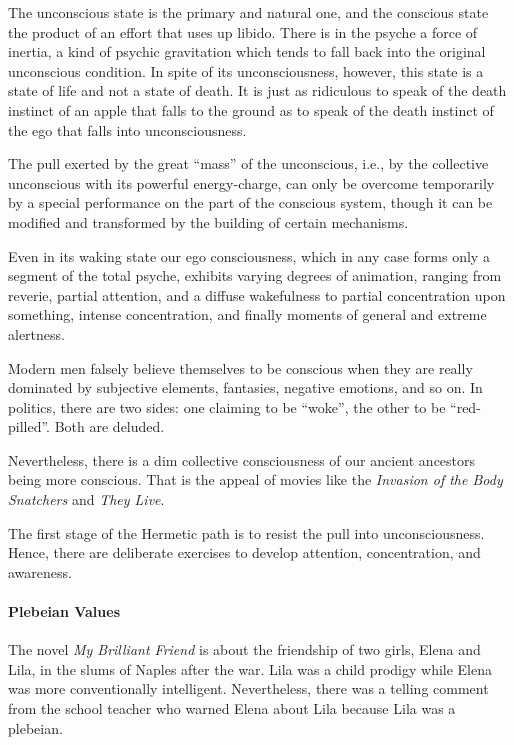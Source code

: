\begin{quotationx}
The unconscious state is the primary and natural one, and the conscious state the product of an effort that uses up libido. There is in the psyche a force of inertia, a kind of psychic gravitation which tends to fall back into the original unconscious condition. In spite of its unconsciousness, however, this state is a state of life and not a state of death. It is just as ridiculous to speak of the death instinct of an apple that falls to the ground as to speak of the death instinct of the ego that falls into unconsciousness.

The pull exerted by the great ``mass'' of the unconscious, i.e., by the collective unconscious with its powerful energy-charge, can only be overcome temporarily by a special performance on the part of the conscious system, though it can be modified and transformed by the building of certain mechanisms.

Even in its waking state our ego consciousness, which in any case forms only a segment of the total psyche, exhibits varying degrees of animation, ranging from reverie, partial attention, and a diffuse wakefulness to partial concentration upon something, intense concentration, and finally moments of general and extreme alertness.
\end{quotationx}


Modern men falsely believe themselves to be conscious when they are really dominated by subjective elements, fantasies, negative emotions, and so on. In politics, there are two sides: one claiming to be ``woke'', the other to be ``red-pilled''. Both are deluded.

Nevertheless, there is a dim collective consciousness of our ancient ancestors being more conscious. That is the appeal of movies like the \emph{Invasion of the Body Snatchers} and \emph{They Live}.


The first stage of the Hermetic path is to resist the pull into unconsciousness. Hence, there are deliberate exercises to develop attention, concentration, and awareness.

\paragraph{Plebeian Values}


The novel \textit{My Brilliant Friend} is about the friendship of two girls, Elena and Lila, in the slums of Naples after the war. Lila was a child prodigy while Elena was more conventionally intelligent. Nevertheless, there was a telling comment from the school teacher who warned Elena about Lila because Lila was a plebeian.

